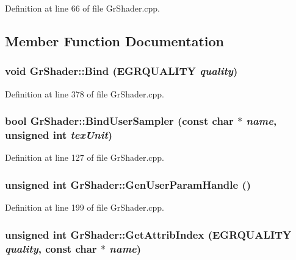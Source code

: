 \begin{CompactItemize}
Definition at line 66 of file GrShader.cpp.

\subsection{Member Function Documentation}
\hypertarget{class_gr_shader_f32a4e5288174733e6460afac22c21c3}{
\subsubsection[{Bind}]{\setlength{\rightskip}{0pt plus 5cm}void GrShader::Bind ({\bf EGRQUALITY} {\em quality})}}
\label{class_gr_shader_f32a4e5288174733e6460afac22c21c3}




Definition at line 378 of file GrShader.cpp.\hypertarget{class_gr_shader_a482dc096d94ac3e751bce76dcae167b}{
\subsubsection[{BindUserSampler}]{\setlength{\rightskip}{0pt plus 5cm}bool GrShader::BindUserSampler (const char $\ast$ {\em name}, \/  unsigned int {\em texUnit})}}
\label{class_gr_shader_a482dc096d94ac3e751bce76dcae167b}




Definition at line 127 of file GrShader.cpp.\hypertarget{class_gr_shader_c7df07b490ebee35fc316ccdccaf0a91}{
\subsubsection[{GenUserParamHandle}]{\setlength{\rightskip}{0pt plus 5cm}unsigned int GrShader::GenUserParamHandle ()}}
\label{class_gr_shader_c7df07b490ebee35fc316ccdccaf0a91}




Definition at line 199 of file GrShader.cpp.\hypertarget{class_gr_shader_6aaf2b4a333467d7c254dd2f4d862a83}{
\subsubsection[{GetAttribIndex}]{\setlength{\rightskip}{0pt plus 5cm}unsigned int GrShader::GetAttribIndex ({\bf EGRQUALITY} {\em quality}, \/  const char $\ast$ {\em name})}}
\label{class_gr_shader_6aaf2b4a333467d7c254dd2f4d862a83}





\end{CompactItemize}
